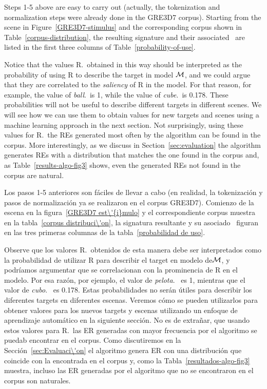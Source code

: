 Steps 1-5 above are easy to carry out (actually, the tokenization and
normalization steps were already done in the GRE3D7 corpus).  Starting
from the scene in Figure~\ref{GRE3D7-stimulus} and the corresponding
corpus shown in Table~\ref{corpus-distribution}, the resulting
signature and their associated \puse\ are listed in the first three
columns of Table~\ref{probability-of-use}.

Notice that the values R.\puse\ obtained in this way should be
interpreted as the probability of using R to describe the target in
model $\mathcal{M}$, and we could argue that they are correlated to the
\emph{saliency} of R in the model.  For that reason, for example, the
value of \emph{ball}.\puse\ is 1, while the value of
\emph{cube}.\puse\ is 0.178.  These probabilities will not be useful
to describe different targets in different scenes.  We will see how we
can use them to obtain values for new targets and scenes using a
machine learning approach in the next section.  Not surprisingly,
using these values for R.\puse\ the REs generated most often by the
algorithm can be found in the corpus.  More interestingly, as we
discuss in Section~\ref{sec:evaluation} the algorithm generates REs
with a distribution that matches the one found in the corpus and, as
Table~\ref{results-algo-fig3} shows, even the generated REs not found
in the corpus are natural.

Los pasos 1-5 anteriores son f\'aciles de llevar a cabo (en realidad, la tokenizaci\'on y
pasos de normalizaci\'on ya se realizaron en el corpus GRE3D7). Comienzo
de la escena en la figura~\ref{GRE3D7 est\'{i}mulo} y el correspondiente
corpus muestra en la tabla~\ref{corpus distribuci\'on}, la signatura resultante
y su asociado \puse\ figuran en las tres primeras
columnas de la tabla~\ref{probabilidad de uso}.

Observe que los valores R.\puse\ obtenidos de esta manera debe ser
interpretados como la probabilidad de utilizar R para describir el target en
modelo de$\mathcal{M} $, y podr\'{i}amos argumentar que se correlacionan con la
 prominencia de R en el modelo. Por esa raz\'on, por ejemplo, el
valor de \emph{pelota}. \puse\ es 1, mientras que el valor de
\emph{cubo}. \puse\ es 0.178. Estas probabilidades no ser\'an \'utiles
para describir los diferentes targets en diferentes escenas. Veremos c\'omo se
pueden utilizarlos para obtener valores para los nuevos targets y escenas utilizando un
enfoque de aprendizaje autom\'atico en la siguiente secci\'on. No es de extra\~nar,
que usando estos valores para R.\puse\ las ER generadas con mayor frecuencia por el
algoritmo se puedab encontrar en el corpus. Como discutiremos en la Secci\'on~\ref{sec:Evaluaci\'on} el algoritmo genera ER
con una distribuci\'on que coincide con la encontrada en el corpus y, como la
Tabla~\ref{resultados-algo-fig3} muestra, incluso las ER generadas por el algoritmo que no se encontraron
en el corpus son naturales.


